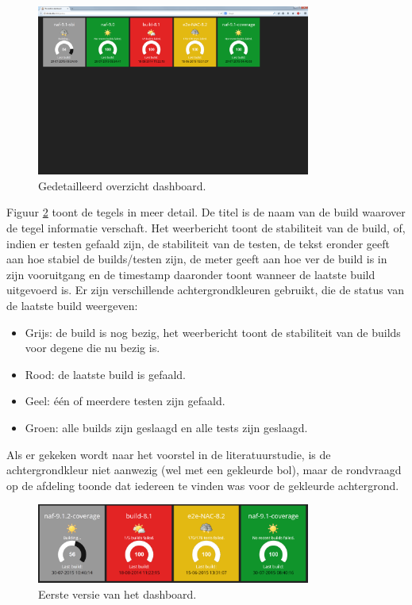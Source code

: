 \documentclass[10pt,a4paper]{article}
\begin{document}
\begin{figure}[ht!]
\centering
\includegraphics[width=90mm]{dashboard_screenshot1.png}
\caption{Gedetailleerd overzicht dashboard.} 
\label{dash_1}
\end{figure}

Figuur \ref{dash_2} toont de tegels in meer detail. De titel is de naam van de build waarover de tegel informatie verschaft. Het weerbericht toont de stabiliteit van de build, of, indien er testen gefaald zijn, de stabiliteit van de testen, de tekst eronder geeft aan hoe stabiel de builds/testen zijn, de meter geeft aan hoe ver de build is in zijn vooruitgang en de timestamp daaronder toont wanneer de laatste build uitgevoerd is.
Er zijn verschillende achtergrondkleuren gebruikt, die de status van de laatste build weergeven:
\begin{itemize}
\item Grijs: de build is nog bezig, het weerbericht toont de stabiliteit van de builds voor degene die nu bezig is.
\item Rood: de laatste build is gefaald.
\item Geel: \'e\'en of meerdere testen zijn gefaald.
\item Groen: alle builds zijn geslaagd en alle tests zijn geslaagd. 
\end{itemize}
Als er gekeken wordt naar het voorstel in de literatuurstudie, is de achtergrondkleur niet aanwezig (wel met een gekleurde bol), maar de rondvraagd op de afdeling toonde dat iedereen te vinden was voor de gekleurde achtergrond.

\begin{figure}[ht!]
\centering
\includegraphics[width=90mm]{screenshot2.png}
\caption{Eerste versie van het dashboard.} 
\label{dash_2}
\end{figure}
\end{document}
